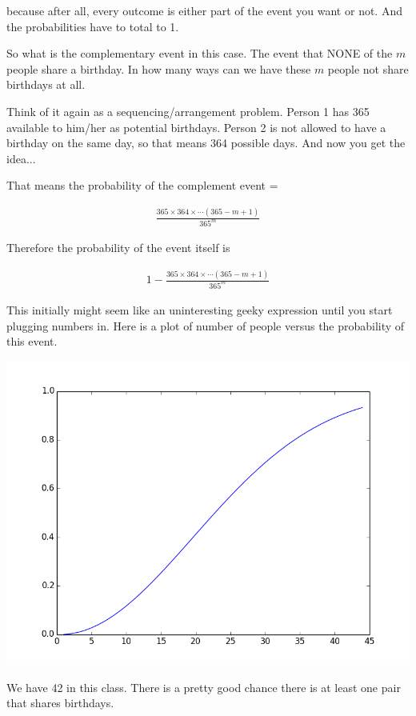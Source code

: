 \documentclass[12pt]{article}
\begin{document}
because after all, every outcome is either part of the event you want or not. And the probabilities have to total to 1.

So what is the complementary event in this case. The event that NONE of the $m$ people share a birthday. In how many ways can we have these $m$ people not share birthdays at all.

Think of it again as a sequencing/arrangement problem. Person 1 has 365 available to him/her as potential birthdays. Person 2 is not allowed to have a birthday on the same day, so that means 364 possible days. And now you get the idea...

That means the probability of the complement event = 

\begin{align*}
\frac{365 \times 364 \times \cdots (365-m+1)}{365^m}
\end{align*}

Therefore the probability of the event itself is

\begin{align*}
1 - \frac{365 \times 364 \times \cdots (365-m+1)}{365^m}
\end{align*}

This initially might seem like an uninteresting geeky expression until you start plugging numbers in. Here is a plot of number of people versus the probability of this event.

\includegraphics[scale=0.6]{birthday.png}

We have 42 in this class. There is a pretty good chance there is at least one pair that shares birthdays.
\end{document}
